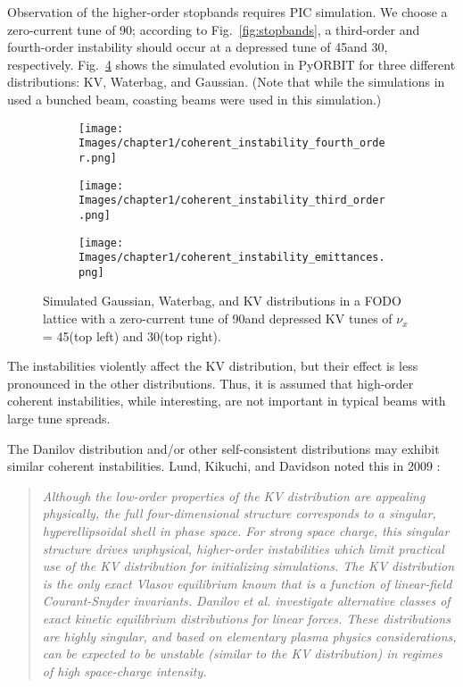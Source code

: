 Observation of the higher-order stopbands requires PIC simulation. We choose a zero-current tune of 90\degree; according to Fig.~\ref{fig:stopbands}, a third-order and fourth-order instability should occur at a depressed tune of 45\degree and 30\degree, respectively. Fig.~\ref{fig:coherent_instabilities} shows the simulated evolution in PyORBIT for three different distributions: KV, Waterbag, and Gaussian. (Note that while the simulations in \cite{Hofmann2017Book} used a bunched beam, coasting beams were used in this simulation.)
%
\begin{figure}[!p]
    \begin{subfigure}[b]{0.47\textwidth}
        \texttt{[image: Images/chapter1/coherent\_instability\_fourth\_order.png]}
        \label{fig:coherent_instabilities_a}
    \end{subfigure}
    \hfill
    \begin{subfigure}[b]{0.47\textwidth}
        \texttt{[image: Images/chapter1/coherent\_instability\_third\_order.png]}
        \label{fig:f2}
    \end{subfigure}
    \vfill
    \begin{subfigure}[b]{\textwidth}
        \centering
        \texttt{[image: Images/chapter1/coherent\_instability\_emittances.png]}
        \label{fig:coherent_instabilities_b}
    \end{subfigure}
    \caption{Simulated Gaussian, Waterbag, and KV distributions in a FODO lattice with a zero-current tune of 90\degree and depressed KV tunes of $\nu_x$ = 45\degree (top left) and 30\degree (top right).}
    \label{fig:coherent_instabilities}
\end{figure}
%
The instabilities violently affect the KV distribution, but their effect is less pronounced in the other distributions. Thus, it is assumed that high-order coherent instabilities, while interesting, are not important in typical beams with large tune spreads.

The Danilov distribution and/or other self-consistent distributions may exhibit similar coherent instabilities. Lund, Kikuchi, and Davidson noted this in 2009 \cite{Lund2009}:
\begin{quote}
    \textit{Although the low-order properties of the KV distribution are appealing physically, the full four-dimensional structure corresponds to a singular, hyperellipsoidal shell in phase space. For strong space charge, this singular structure drives unphysical, higher-order instabilities which limit practical use of the KV distribution for initializing simulations. The KV distribution is the only exact Vlasov equilibrium known that is a function of linear-field Courant-Snyder invariants. Danilov et al. \cite{Danilov2003} investigate alternative classes of exact kinetic equilibrium distributions for linear forces. These distributions are highly singular, and based on elementary plasma physics considerations, can be expected to be unstable (similar to the KV distribution) in regimes of high space-charge intensity.}
\end{quote}